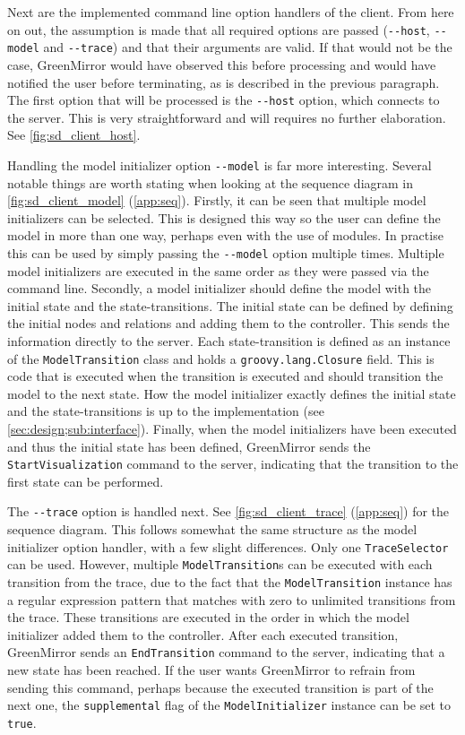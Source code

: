 Next are the implemented command line option handlers of the client. From here on out, the assumption is made that all required options are passed (\lstinline{--host}, \lstinline{--model} and \lstinline{--trace}) and that their arguments are valid. If that would not be the case, GreenMirror would have observed this before processing and would have notified the user before terminating, as is described in the previous paragraph. The first option that will be processed is the \lstinline{--host} option, which connects to the server. This is very straightforward and will requires no further elaboration. See \cref{fig:sd_client_host}.
\par Handling the model initializer option \lstinline{--model} is far more interesting. Several notable things are worth stating when looking at the sequence diagram in \cref{fig:sd_client_model} (\cref{app:seq}). Firstly, it can be seen that multiple model initializers can be selected. This is designed this way so the user can define the model in more than one way, perhaps even with the use of modules. In practise this can be used by simply passing the \lstinline{--model} option multiple times. Multiple model initializers are executed in the same order as they were passed via the command line. Secondly, a model initializer should define the model with the initial state and the state-transitions. The initial state can be defined by defining the initial nodes and relations and adding them to the controller. This sends the information directly to the server. Each state-transition is defined as an instance of the \lstinline{ModelTransition} class and holds a \lstinline{groovy.lang.Closure} field. This is code that is executed when the transition is executed and should transition the model to the next state. How the model initializer exactly defines the initial state and the state-transitions is up to the implementation (see \cref{sec:design;sub:interface}). Finally, when the model initializers have been executed and thus the initial state has been defined, GreenMirror sends the \lstinline{StartVisualization} command to the server, indicating that the transition to the first state can be performed. 
\par The \lstinline{--trace} option is handled next. See \cref{fig:sd_client_trace} (\cref{app:seq}) for the sequence diagram. This follows somewhat the same structure as the model initializer option handler, with a few slight differences. Only one \lstinline{TraceSelector} can be used. However, multiple \lstinline{ModelTransition}s can be executed with each transition from the trace, due to the fact that the \lstinline{ModelTransition} instance has a regular expression pattern that matches with zero to unlimited transitions from the trace. These transitions are executed in the order in which the model initializer added them to the controller. After each executed transition, GreenMirror sends an \lstinline{EndTransition} command to the server, indicating that a new state has been reached. If the user wants GreenMirror to refrain from sending this command, perhaps because the executed transition is part of the next one, the \lstinline{supplemental} flag of the \lstinline{ModelInitializer} instance can be set to \lstinline{true}.
